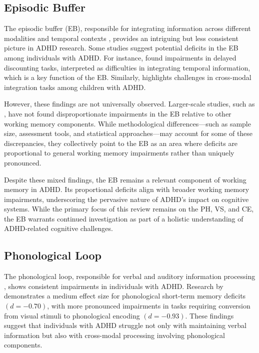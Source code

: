 \documentclass[stu]{apa7}
\begin{document}
\subsection{Episodic Buffer}

The episodic buffer (EB), responsible for integrating information across different modalities and temporal contexts \parencite{baddeley_developments_1994}, provides an intriguing but less consistent picture in ADHD research. Some studies suggest potential deficits in the EB among individuals with ADHD. For instance, \textcite{fabio_working_2020} found impairments in delayed discounting tasks, interpreted as difficulties in integrating temporal information, which is a key function of the EB. Similarly, \textcite{nyhout_episodic_2023} highlights challenges in cross-modal integration tasks among children with ADHD.

However, these findings are not universally observed. Larger-scale studies, such as \textcite{kofler_are_2018}, have not found disproportionate impairments in the EB relative to other working memory components. While methodological differences—such as sample size, assessment tools, and statistical approaches—may account for some of these discrepancies, they collectively point to the EB as an area where deficits are proportional to general working memory impairments rather than uniquely pronounced.

Despite these mixed findings, the EB remains a relevant component of working memory in ADHD. Its proportional deficits align with broader working memory impairments, underscoring the pervasive nature of ADHD's impact on cognitive systems. While the primary focus of this review remains on the PH, VS, and CE, the EB warrants continued investigation as part of a holistic understanding of ADHD-related cognitive challenges.

\subsection{Phonological Loop}



The phonological loop, responsible for verbal and auditory information processing \parencite{baddeley_developments_1994}, shows consistent impairments in individuals with ADHD. Research by \textcite{friedman_reading_2017} demonstrates a medium effect size for phonological short-term memory deficits \((d = -0.70)\), with more pronounced impairments in tasks requiring conversion from visual stimuli to phonological encoding \((d = -0.93)\). These findings suggest that individuals with ADHD struggle not only with maintaining verbal information but also with cross-modal processing involving phonological components.
\end{document}
